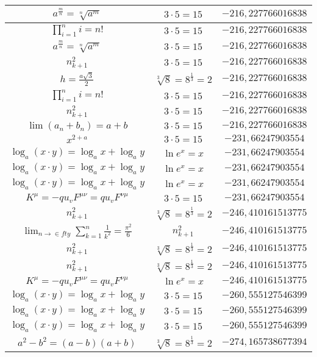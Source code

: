 \documentclass{article}
\begin{document}
\begin{flushleft}
\begin{longtable}{|c|c|c|}
$a^{\frac{m}{n}}=\sqrt[n]{a^{m}}$ & $3\cdot 5=15$ & $-216,227766016838$ \\ \hline 
$\prod_{i=1}^ni=n!$ & $3\cdot 5=15$ & $-216,227766016838$ \\ \hline 
$a^{\frac{m}{n}}=\sqrt[n]{a^{m}}$ & $3\cdot 5=15$ & $-216,227766016838$ \\ \hline 
$n_{k+1}^2$ & $3\cdot 5=15$ & $-216,227766016838$ \\ \hline 
$h=\frac{a\sqrt{3}}{2}$ & $\sqrt[3]{8}=8^{\frac{1}{3}}=2$ & $-216,227766016838$ \\ \hline 
$\prod_{i=1}^ni=n!$ & $3\cdot 5=15$ & $-216,227766016838$ \\ \hline 
$n_{k+1}^2$ & $3\cdot 5=15$ & $-216,227766016838$ \\ \hline 
$\lim\left(a_n+b_n\right)=a+b$ & $3\cdot 5=15$ & $-216,227766016838$ \\ \hline 
$x^{2+a}$ & $3\cdot 5=15$ & $-231,66247903554$ \\ \hline 
$\log_{a}(x\cdot y)=\log_{a}x+\log_{a}y$ & $\ln e^x=x$ & $-231,66247903554$ \\ \hline 
$\log_{a}(x\cdot y)=\log_{a}x+\log_{a}y$ & $\ln e^x=x$ & $-231,66247903554$ \\ \hline 
$\log_{a}(x\cdot y)=\log_{a}x+\log_{a}y$ & $\ln e^x=x$ & $-231,66247903554$ \\ \hline 
$K^\mu=-qu_vF^{\mu\nu}=qu_vF^{\nu\mu}$ & $3\cdot 5=15$ & $-231,66247903554$ \\ \hline 
$n_{k+1}^2$ & $\sqrt[3]{8}=8^{\frac{1}{3}}=2$ & $-246,410161513775$ \\ \hline 
$\lim_{n\to\in fty}\sum_{k=1}^n\frac{1}{k^2}=\frac{\pi^2}{6}$ & $n_{k+1}^2$ & $-246,410161513775$ \\ \hline 
$n_{k+1}^2$ & $\sqrt[3]{8}=8^{\frac{1}{3}}=2$ & $-246,410161513775$ \\ \hline 
$n_{k+1}^2$ & $\sqrt[3]{8}=8^{\frac{1}{3}}=2$ & $-246,410161513775$ \\ \hline 
$K^\mu=-qu_vF^{\mu\nu}=qu_vF^{\nu\mu}$ & $\ln e^x=x$ & $-246,410161513775$ \\ \hline 
$\log_{a}(x\cdot y)=\log_{a}x+\log_{a}y$ & $3\cdot 5=15$ & $-260,555127546399$ \\ \hline 
$\log_{a}(x\cdot y)=\log_{a}x+\log_{a}y$ & $3\cdot 5=15$ & $-260,555127546399$ \\ \hline 
$\log_{a}(x\cdot y)=\log_{a}x+\log_{a}y$ & $3\cdot 5=15$ & $-260,555127546399$ \\ \hline 
$a^2-b^2=(a-b)(a+b)$ & $\sqrt[3]{8}=8^{\frac{1}{3}}=2$ & $-274,165738677394$ \\ \hline 

\end{longtable}
\end{flushleft}
\end{document}
